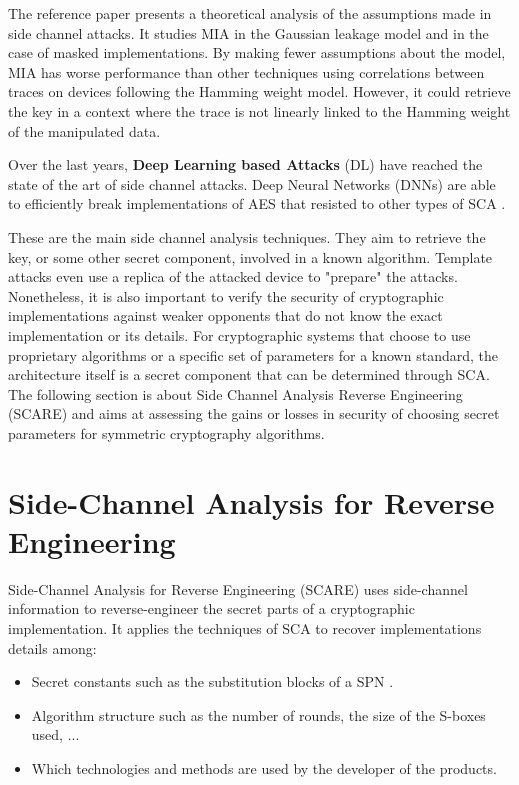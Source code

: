 \documentclass[11pt]{sdm}
\begin{document}
The reference paper \parencite{Prouff_Rivain_2009} presents a theoretical analysis of the assumptions made in side channel attacks.
It studies MIA in the Gaussian leakage model and in the case of masked implementations.
By making fewer assumptions about the model, MIA has worse performance than other techniques using correlations between traces on devices following the Hamming weight model.
However, it could retrieve the key in a context where the trace is not linearly linked to the Hamming weight of the manipulated data.


Over the last years, \textbf{Deep Learning based Attacks} (DL) have reached the state of the art of side channel attacks.
Deep Neural Networks (DNNs) are able to efficiently break implementations of AES that resisted to other types of SCA \parencite{Maghrebi_Portigliatti_Prouff_2016}.

These are the main side channel analysis techniques. They aim to retrieve the key, or some other secret component, involved in a known algorithm.
Template attacks even use a replica of the attacked device to "prepare" the attacks.
Nonetheless, it is also important to verify the security of cryptographic implementations against weaker opponents that do not know the exact implementation or its details.
For cryptographic systems that choose to use proprietary algorithms or a specific set of parameters for a known standard, the architecture itself is a secret component that can be determined through SCA.
The following section is about Side Channel Analysis Reverse Engineering (SCARE) and aims at assessing the gains or losses in security of choosing secret parameters for symmetric cryptography algorithms.





\section{Side-Channel Analysis for Reverse Engineering}

Side-Channel Analysis for Reverse Engineering (SCARE) uses side-channel information to reverse-engineer the secret parts of a cryptographic implementation.
It applies the techniques of SCA to recover implementations details among:
\begin{itemize}
    \item Secret constants such as the substitution blocks of a SPN \parencite{Novak_2003}.
    \item Algorithm structure such as the number of rounds, the size of the S-boxes used, ...
    \item Which technologies and methods are used by the developer of the products.
\end{itemize}
\end{document}
